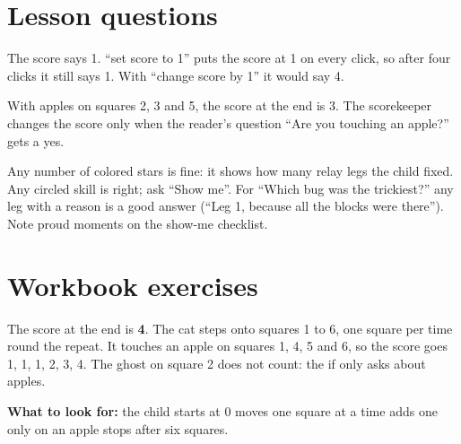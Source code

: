 
\section{Lesson questions}
\begin{answer}
The score says 1. \enquote{set score to 1} puts the score at 1 on every click, so after four clicks it still says 1. With \enquote{change score by 1} it would say 4.
\end{answer}

\begin{answer}
With apples on squares 2, 3 and 5, the score at the end is 3. The scorekeeper changes the score only when the reader's question \enquote{Are you touching an apple?} gets a yes.
\end{answer}

\begin{answer}[Reflection]
Any number of colored stars is fine: it shows how many relay legs the child fixed. Any circled skill is right; ask \enquote{Show me}. For \enquote{Which bug was the trickiest?} any leg with a reason is a good answer (\enquote{Leg 1, because all the blocks were there}). Note proud moments on the show-me checklist.
\end{answer}

\section{Workbook exercises}
\begin{answer}
The score at the end is \textbf{4}. The cat steps onto squares 1 to 6, one square per time round the repeat. It touches an apple on squares 1, 4, 5 and 6, so the score goes 1, 1, 1, 2, 3, 4. The ghost on square 2 does not count: the if only asks about apples.

\textbf{What to look for:} \tickbox{} the child starts at 0 \quad \tickbox{} moves one square at a time \quad \tickbox{} adds one only on an apple \quad \tickbox{} stops after six squares.
\end{answer}

